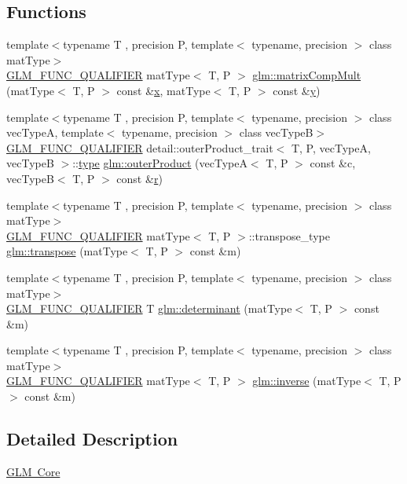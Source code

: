 \subsection*{Functions}
\begin{DoxyCompactItemize}
\item 
{\footnotesize template$<$typename T , precision P, template$<$ typename, precision $>$ class mat\+Type$>$ }\\\mbox{\hyperlink{setup_8hpp_a33fdea6f91c5f834105f7415e2a64407}{G\+L\+M\+\_\+\+F\+U\+N\+C\+\_\+\+Q\+U\+A\+L\+I\+F\+I\+ER}} mat\+Type$<$ T, P $>$ \mbox{\hyperlink{group__core__func__matrix_ga4a54992e4741188ee624b21e3ba91814}{glm\+::matrix\+Comp\+Mult}} (mat\+Type$<$ T, P $>$ const \&\mbox{\hyperlink{glad_8h_a92d0386e5c19fb81ea88c9f99644ab1d}{x}}, mat\+Type$<$ T, P $>$ const \&\mbox{\hyperlink{glad_8h_a66ddd433d2cacfe27f5906b7e86faeed}{y}})
\item 
{\footnotesize template$<$typename T , precision P, template$<$ typename, precision $>$ class vec\+TypeA, template$<$ typename, precision $>$ class vec\+TypeB$>$ }\\\mbox{\hyperlink{setup_8hpp_a33fdea6f91c5f834105f7415e2a64407}{G\+L\+M\+\_\+\+F\+U\+N\+C\+\_\+\+Q\+U\+A\+L\+I\+F\+I\+ER}} detail\+::outer\+Product\+\_\+trait$<$ T, P, vec\+TypeA, vec\+TypeB $>$\+::\mbox{\hyperlink{glad_8h_a890efa53b3d7deeeced6f3a0d6653ed3}{type}} \mbox{\hyperlink{group__core__func__matrix_gae9f513dc8e4f3ceb993669321b6d0f09}{glm\+::outer\+Product}} (vec\+TypeA$<$ T, P $>$ const \&c, vec\+TypeB$<$ T, P $>$ const \&\mbox{\hyperlink{glad_8h_abe08814c2f72843fde4d8df41440d5a0}{r}})
\item 
{\footnotesize template$<$typename T , precision P, template$<$ typename, precision $>$ class mat\+Type$>$ }\\\mbox{\hyperlink{setup_8hpp_a33fdea6f91c5f834105f7415e2a64407}{G\+L\+M\+\_\+\+F\+U\+N\+C\+\_\+\+Q\+U\+A\+L\+I\+F\+I\+ER}} mat\+Type$<$ T, P $>$\+::transpose\+\_\+type \mbox{\hyperlink{namespaceglm_a44eaf0309b3d7a9e71e31b5d4a8dbaab}{glm\+::transpose}} (mat\+Type$<$ T, P $>$ const \&m)
\item 
{\footnotesize template$<$typename T , precision P, template$<$ typename, precision $>$ class mat\+Type$>$ }\\\mbox{\hyperlink{setup_8hpp_a33fdea6f91c5f834105f7415e2a64407}{G\+L\+M\+\_\+\+F\+U\+N\+C\+\_\+\+Q\+U\+A\+L\+I\+F\+I\+ER}} T \mbox{\hyperlink{group__core__func__matrix_ga26ea77c574802bc6fc193c40478718d2}{glm\+::determinant}} (mat\+Type$<$ T, P $>$ const \&m)
\item 
{\footnotesize template$<$typename T , precision P, template$<$ typename, precision $>$ class mat\+Type$>$ }\\\mbox{\hyperlink{setup_8hpp_a33fdea6f91c5f834105f7415e2a64407}{G\+L\+M\+\_\+\+F\+U\+N\+C\+\_\+\+Q\+U\+A\+L\+I\+F\+I\+ER}} mat\+Type$<$ T, P $>$ \mbox{\hyperlink{group__core__func__matrix_gaff4e89603cf51cdbcedebc57cd8808a3}{glm\+::inverse}} (mat\+Type$<$ T, P $>$ const \&m)
\end{DoxyCompactItemize}


\subsection{Detailed Description}
\mbox{\hyperlink{group__core}{G\+LM Core}} 